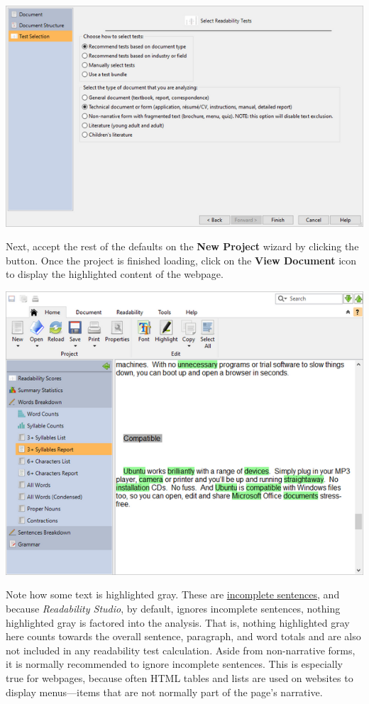 \documentclass[
]{book}
\theoremstyle{definition}
\theoremstyle{definition}
\theoremstyle{definition}
\theoremstyle{definition}
\theoremstyle{remark}
\begin{document}
\includegraphics{Images/wizarddoctypetechselected.png}

Next, accept the rest of the defaults on the \textbf{New Project} wizard by clicking the  button. Once the project is finished loading, click on the \textbf{View Document} icon to display the highlighted content of the webpage.

\includegraphics{Images/incompletesentences.png}

Note how some text is highlighted gray. These are \protect\hyperlink{how-text-is-excluded}{incomplete sentences}, and because \emph{Readability Studio}, by default, ignores incomplete sentences, nothing highlighted gray is factored into the analysis. That is, nothing highlighted gray here counts towards the overall sentence, paragraph, and word totals and are also not included in any readability test calculation. Aside from non-narrative forms, it is normally recommended to ignore incomplete sentences. This is especially true for webpages, because often HTML tables and lists are used on websites to display menus---items that are not normally part of the page's narrative.
\end{document}

